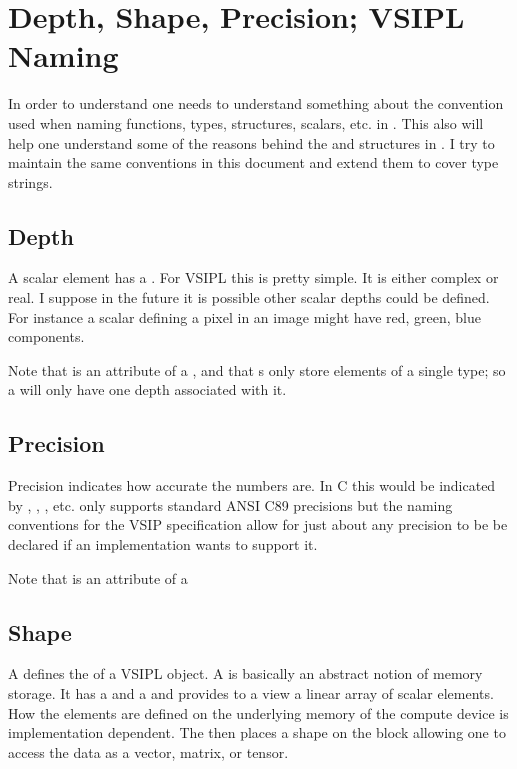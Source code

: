 \clearpage
\section*{Depth, Shape, Precision; VSIPL Naming}
In order to understand \cvl{} one needs to understand something about the convention used when naming functions, types, structures, scalars, etc. in \cvl. This also will help one understand some of the reasons behind the  and  structures in \cvl. I try to maintain the same conventions in this document and extend them to cover \pyjv type strings.
%
\subsection*{Depth}
A scalar element has a .  For VSIPL this is pretty simple.  It is either complex or real. I suppose in the future it is possible other scalar depths could be defined. For instance a scalar defining a pixel in an image might have red, green, blue components. 

Note that  is an attribute of a , and that s only store elements of a single type; so a  will only have one depth associated with it. 
%
\subsection*{Precision}
Precision indicates how accurate the numbers are. In C this would be indicated by , , , etc. \jv only supports standard ANSI C89 precisions but the naming conventions for the VSIP specification allow for just about any precision to be be declared if an implementation wants to support it.

Note that  is an attribute of a 
%
\subsection*{Shape}
A  defines the  of a VSIPL object. A  is basically an abstract notion of memory storage. It has a  and a  and provides to a view a linear array of scalar elements.  How the elements are defined on the underlying memory of the compute device is implementation dependent. The  then places a shape on the block allowing one to access the data as a vector, matrix, or tensor. 

